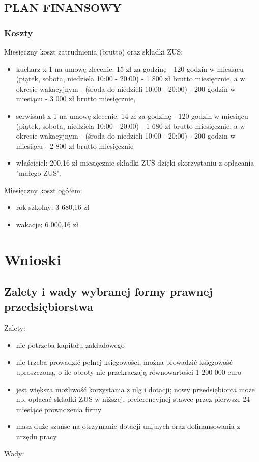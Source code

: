 \documentclass{sprawozdanie-agh}
\begin{document}
		\subsection{PLAN FINANSOWY}
		\subsubsection{Koszty}
		Miesięczny koszt zatrudnienia (brutto) oraz składki ZUS:
		\begin{itemize}
			\item kucharz x 1 na umowę zlecenie: 15 zł za godzinę - 120 godzin w miesiącu (piątek, sobota, niedziela 10:00 - 20:00) - 1 800 zł brutto miesięcznie, a w okresie wakacyjnym - (środa do niedzieli 10:00 - 20:00) - 200 godzin w miesiącu - 3 000 zł brutto miesięcznie,
			\item serwisant x 1 na umowę zlecenie: 14 zł za godzinę - 120 godzin w miesiącu (piątek, sobota, niedziela 10:00 - 20:00) - 1 680 zł brutto miesięcznie, a w okresie wakacyjnym - (środa do niedzieli 10:00 - 20:00) - 200 godzin w miesiącu - 2 800 zł brutto miesięcznie
			\item właściciel: 200,16 zł miesięcznie składki ZUS dzięki skorzystaniu z opłacania "małego ZUS",
		\end{itemize}
		Miesięczny koszt ogółem: 
		\begin{itemize}
			\item rok szkolny: 3 680,16 zł
			\item wakacje: 6 000,16 zł
		\end{itemize}

	\section{Wnioski} 

		\subsection{Zalety i wady wybranej formy prawnej przedsiębiorstwa}
 
		Zalety:

		\begin{itemize}
			\item nie potrzeba kapitału zakładowego
			\item nie trzeba prowadzić pełnej księgowości, można prowadzić księgowość uproszczoną, o ile obroty nie przekraczają równowartości 1 200 000 euro
			\item jest większa możliwość korzystania z ulg i dotacji; nowy przedsiębiorca może np. opłacać składki ZUS w niższej, preferencyjnej stawce przez pierwsze 24 miesiące prowadzenia firmy
			\item masz duże szanse na otrzymanie dotacji unijnych oraz dofinansowania z urzędu pracy
		\end{itemize}
		Wady:
\end{document}

